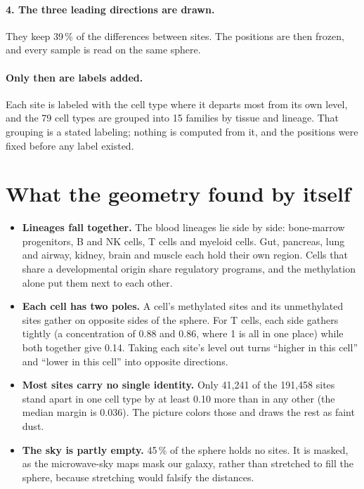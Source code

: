\paragraph{4. The three leading directions are drawn.} They keep 39\,\% of the differences between sites. The positions are then frozen,
and every sample is read on the same sphere.

\paragraph{Only then are labels added.} Each site is labeled with the cell type where it departs most from its own level, and the 79
cell types are grouped into 15 families by tissue and lineage. That grouping is a stated labeling; nothing is computed from it, and the
positions were fixed before any label existed.

\section{What the geometry found by itself}

\begin{itemize}
\item \textbf{Lineages fall together.} The blood lineages lie side by side: bone-marrow progenitors, B and NK cells, T cells and myeloid
cells. Gut, pancreas, lung and airway, kidney, brain and muscle each hold their own region. Cells that share a developmental origin share
regulatory programs, and the methylation alone put them next to each other.
\item \textbf{Each cell has two poles.} A cell's methylated sites and its unmethylated sites gather on opposite sides of the sphere. For T
cells, each side gathers tightly (a concentration of 0.88 and 0.86, where 1 is all in one place) while both together give 0.14. Taking
each site's level out turns ``higher in this cell'' and ``lower in this cell'' into opposite directions.
\item \textbf{Most sites carry no single identity.} Only 41{,}241 of the 191{,}458 sites stand apart in one cell type by at least 0.10
more than in any other (the median margin is 0.036). The picture colors those and draws the rest as faint dust.
\item \textbf{The sky is partly empty.} 45\,\% of the sphere holds no sites. It is masked, as the microwave-sky maps mask our galaxy,
rather than stretched to fill the sphere, because stretching would falsify the distances.
\end{itemize}

